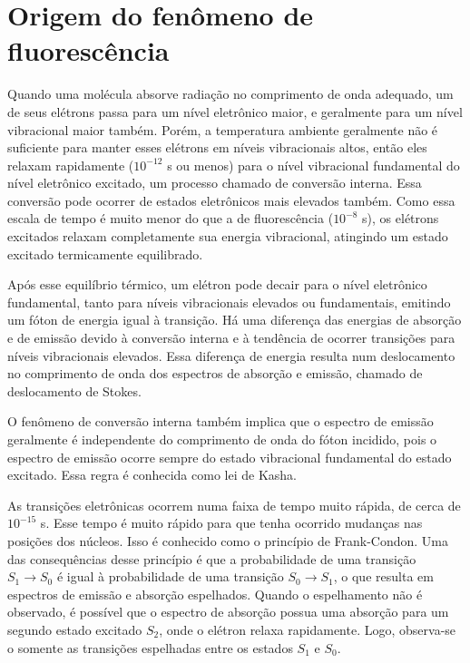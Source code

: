		\section{Origem do fenômeno de fluorescência}
		
		Quando uma molécula absorve radiação no comprimento de onda adequado, um de seus elétrons passa para um nível eletrônico maior, e geralmente para um nível vibracional maior também. Porém, a temperatura ambiente geralmente não é suficiente para manter esses elétrons em níveis vibracionais altos, então eles relaxam rapidamente (\(10^{-12}\) s ou menos) para o nível vibracional fundamental do nível eletrônico excitado, um processo chamado de conversão interna. Essa conversão pode ocorrer de estados eletrônicos mais elevados também. Como essa escala de tempo é muito menor do que a de fluorescência (\(10^{-8}\) s), os elétrons excitados relaxam completamente sua energia vibracional, atingindo um estado excitado termicamente equilibrado.
		
		Após esse equilíbrio térmico, um elétron pode decair para o nível eletrônico fundamental, tanto para níveis vibracionais elevados ou fundamentais, emitindo um fóton de energia igual à transição. Há uma diferença das energias de absorção e de emissão devido à conversão interna e à tendência de ocorrer transições para níveis vibracionais elevados. Essa diferença de energia resulta num deslocamento no comprimento de onda dos espectros de absorção e emissão, chamado de deslocamento de Stokes.
		
		O fenômeno de conversão interna também implica que o espectro de emissão geralmente é independente do comprimento de onda do fóton incidido, pois o espectro de emissão ocorre sempre do estado vibracional fundamental do estado excitado. Essa regra é conhecida como lei de Kasha.
		
		As transições eletrônicas ocorrem numa faixa de tempo muito rápida, de cerca de \(10^{-15}\) s. Esse tempo é muito rápido para que tenha ocorrido mudanças nas posições dos núcleos. Isso é conhecido como o princípio de Frank-Condon. Uma das consequências desse princípio é que a probabilidade de uma transição \(S_1 \to S_0\) é igual à probabilidade de uma transição \(S_0 \to S_1\), o que resulta em espectros de emissão e absorção espelhados. Quando o espelhamento não é observado, é possível que o espectro de absorção possua uma absorção para um segundo estado excitado \(S_2\), onde o elétron relaxa rapidamente. Logo, observa-se o somente as transições espelhadas entre os estados \(S_1\) e \(S_0\).
			
